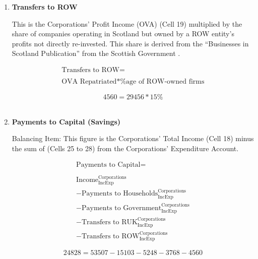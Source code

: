 \begin{enumerate}
\newpage

\item \textbf {Transfers to ROW}

This is the Corporations' Profit Income (OVA) (Cell 19) multiplied by the share of companies operating in Scotland but owned by a ROW entity's profits not directly re-invested.  This share is derived from the ``Businesses in Scotland Publication'' from the Scottish Government \cite{ONS2011c, ScotGov2011}.

\begin{equation}
\begin{split}
\text{Transfers to ROW} =  \\ \\
\text{OVA Repatriated}*\text{\%age of ROW-owned firms}
\end{split} \label{eq:2.5.32}
\end{equation}

\begin{equation} \nonumber
4560 = 29456*15\%
\end{equation}\\


\item \textbf {Payments to Capital (Savings)}

Balancing Item: This figure is the Corporations' Total Income (Cell 18) minus the sum of (Cells 25 to 28) from the Corporations' Expenditure Account.

\begin{equation}
\begin{split}
\text{Payments to Capital} =  \\ \\
\text{Income}^\text{Corporations}_\text{IncExp}\\
-\text{Payments to Households}^\text{Corporations}_\text{IncExp}\\
-\text{Payments to Government}^\text{Corporations}_\text{IncExp}\\
-\text{Transfers to RUK}^\text{Corporations}_\text{IncExp}\\
-\text{Transfers to ROW}^\text{Corporations}_\text{IncExp}
\end{split} \label{eq:2.5.33}
\end{equation}

\begin{equation} \nonumber
24828 = 53507-15103-5248-3768-4560
\end{equation}\\


\newpage



\end{enumerate}

